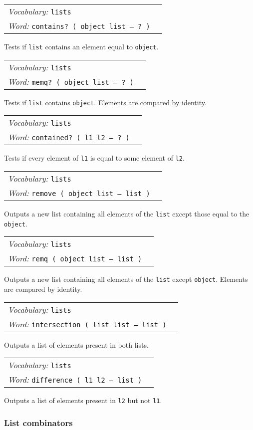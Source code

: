 \documentclass{book}
\newcommand{\vocabulary}[1]{\emph{Vocabulary:} \texttt{#1}&\\}
\newcommand{\ordinaryword}[2]{\index{\texttt{#1}}\emph{Word:} \texttt{#2}&\\}
\newcommand{\wordtable}[1]{

\begin{tabularx}{12cm}[t]{lX}
\hline
#1
\hline
\end{tabularx}

}
\begin{document}
\wordtable{
\vocabulary{lists}
\ordinaryword{contains?}{contains?~( object list -- ?~)}
}
Tests if \texttt{list} contains an element equal to \texttt{object}.
\wordtable{
\vocabulary{lists}
\ordinaryword{memq?}{memq?~( object list -- ?~)}
}
Tests if \texttt{list} contains \texttt{object}. Elements are compared by identity.
\wordtable{
\vocabulary{lists}
\ordinaryword{contained?}{contained?~( l1 l2 -- ?~)}
}
Tests if every element of \texttt{l1} is equal to some element of \texttt{l2}.
\wordtable{
\vocabulary{lists}
\ordinaryword{remove}{remove ( object list -- list )}
}
Outputs a new list containing all elements of the \texttt{list} except those equal to the \texttt{object}.
\wordtable{
\vocabulary{lists}
\ordinaryword{remq}{remq ( object list -- list )}
}
Outputs a new list containing all elements of the \texttt{list} except \texttt{object}. Elements are compared by identity.
\wordtable{
\vocabulary{lists}
\ordinaryword{intersection}{intersection ( list list -- list )}
}
Outputs a list of elements present in both lists.
\wordtable{
\vocabulary{lists}
\ordinaryword{intersection}{difference ( l1 l2 -- list )}
}
Outputs a list of elements present in \texttt{l2} but not \texttt{l1}.

\subsubsection{List combinators}
\end{document}
